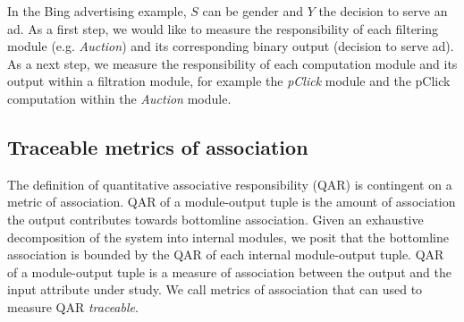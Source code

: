 \documentclass[10pt, onecolumn]{report}
\begin{document}
In the Bing advertising example, $S$ can be gender and $Y$ the decision to serve
an ad. As a first step, we would like to measure the responsibility of each filtering
module (e.g. \emph{Auction}) and its corresponding binary 
output (decision to serve ad). As a next step, we measure the responsibility
of each computation module and its output within a filtration module, for example
the \emph{pClick} module and the pClick computation within the \emph{Auction} module.



\subsection{Traceable metrics of association}



The definition of quantitative associative responsibility (QAR) is contingent on a metric of 
association. QAR of a module-output tuple is the amount of 
association the output contributes towards bottomline association. 
Given an exhaustive decomposition of the system into internal modules, we posit that 
the bottomline association is bounded by the QAR of each internal module-output tuple. 
QAR of a module-output tuple is a measure of association between the output and the
input attribute under study. 
We call metrics of association that can used to measure QAR \emph{traceable}.
\end{document}
